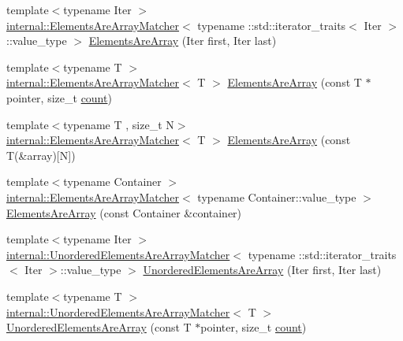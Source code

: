 \begin{DoxyCompactItemize}
\item 
{\footnotesize template$<$typename Iter $>$ }\\\hyperlink{classtesting_1_1internal_1_1_elements_are_array_matcher}{internal\+::\+Elements\+Are\+Array\+Matcher}$<$ typename \+::std\+::iterator\+\_\+traits$<$ Iter $>$\+::value\+\_\+type $>$ \hyperlink{namespacetesting_ae2eee06e7ddbf5f5372fd24372e9703f}{Elements\+Are\+Array} (Iter first, Iter last)
\item 
{\footnotesize template$<$typename T $>$ }\\\hyperlink{classtesting_1_1internal_1_1_elements_are_array_matcher}{internal\+::\+Elements\+Are\+Array\+Matcher}$<$ T $>$ \hyperlink{namespacetesting_abf5c2219b4e6a7542368b5f68eadd007}{Elements\+Are\+Array} (const T $\ast$pointer, size\+\_\+t \hyperlink{gmock__stress__test_8cc_afd9db40e3361ae09188795e8cbe19752}{count})
\item 
{\footnotesize template$<$typename T , size\+\_\+t N$>$ }\\\hyperlink{classtesting_1_1internal_1_1_elements_are_array_matcher}{internal\+::\+Elements\+Are\+Array\+Matcher}$<$ T $>$ \hyperlink{namespacetesting_ac5895c9867d6b976351446a043dcdd66}{Elements\+Are\+Array} (const T(\&array)\mbox{[}N\mbox{]})
\item 
{\footnotesize template$<$typename Container $>$ }\\\hyperlink{classtesting_1_1internal_1_1_elements_are_array_matcher}{internal\+::\+Elements\+Are\+Array\+Matcher}$<$ typename Container\+::value\+\_\+type $>$ \hyperlink{namespacetesting_ad257747adbe056feaa92f449063d681f}{Elements\+Are\+Array} (const Container \&container)
\item 
{\footnotesize template$<$typename Iter $>$ }\\\hyperlink{classtesting_1_1internal_1_1_unordered_elements_are_array_matcher}{internal\+::\+Unordered\+Elements\+Are\+Array\+Matcher}$<$ typename \+::std\+::iterator\+\_\+traits$<$ Iter $>$\+::value\+\_\+type $>$ \hyperlink{namespacetesting_ab4896081406209171a1596b7028e1cf7}{Unordered\+Elements\+Are\+Array} (Iter first, Iter last)
\item 
{\footnotesize template$<$typename T $>$ }\\\hyperlink{classtesting_1_1internal_1_1_unordered_elements_are_array_matcher}{internal\+::\+Unordered\+Elements\+Are\+Array\+Matcher}$<$ T $>$ \hyperlink{namespacetesting_a99b9509a7cd405be28bf45231577384b}{Unordered\+Elements\+Are\+Array} (const T $\ast$pointer, size\+\_\+t \hyperlink{gmock__stress__test_8cc_afd9db40e3361ae09188795e8cbe19752}{count})

\end{DoxyCompactItemize}
